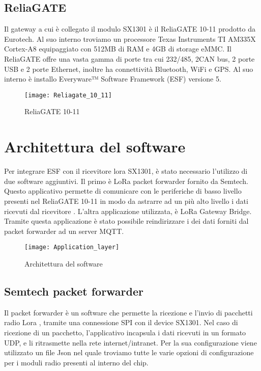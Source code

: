 \subsection{ReliaGATE}
Il gateway a cui è collegato il modulo SX1301 è il ReliaGATE 10-11 prodotto da
Eurotech. Al suo interno troviamo un processore Texas Instruments TI AM335X Cortex-A8 
equipaggiato con 512MB di RAM e 4GB di storage eMMC. Il ReliaGATE offre una
vasta gamma di porte tra cui 232/485, 2CAN bus, 2 porte USB e 2 porte Ethernet,
inoltre ha connettività Bluetooth, WiFi e GPS. Al suo interno è installo
Everyware™ Software Framework (ESF) versione 5.
\begin{figure}[th]
        \centering 
                \texttt{[image: Reliagate\_10\_11]}
        \caption{ReliaGATE 10-11}
        \label{fig:ReliaGATE}
\end{figure}



\section{Architettura del software}
Per integrare ESF con il ricevitore lora SX1301, è stato necessario l'utilizzo
di due software aggiuntivi.
Il primo è LoRa packet forwarder fornito da Semtech. Questo
applicativo permette di comunicare con le periferiche di basso livello presenti
nel ReliaGATE 10-11 in modo da astrarre ad un più alto livello i dati ricevuti dal
ricevitore .
L'altra applicazione utilizzata, è LoRa Gateway Bridge. Tramite questa
applicazione è stato possibile 
reindirizzare i dei dati forniti dal packet forwarder ad un server MQTT.

\begin{figure}[th]
        \centering 
                \texttt{[image: Application\_layer]}
        \caption{Architettura del software}
        \label{fig:Software_stack}
\end{figure}

\subsection{Semtech packet forwarder}
Il packet forwarder è un software che permette la ricezione e l'invio di pacchetti radio Lora ,
tramite una connessione SPI con il device SX1301. Nel caso di ricezione di un
pacchetto, l'applicativo incapsula i dati ricevuti in un formato UDP, e li
ritrasmette nella rete internet/intranet. Per la sua configurazione viene
utilizzato un file Json nel quale troviamo tutte le varie opzioni di
configurazione per i moduli radio presenti al interno del chip.
\inputminted[mathescape, gobble=2, frame=lines, linenos=true
framesep=2mm, firstline=1,lastline=23]{json}{Code_Files/global_json.conf}
\inputminted[mathescape, gobble=2, frame=lines, linenos=true
framesep=2mm, firstline=173,lastline=184]{json}{Code_Files/global_json.conf}

